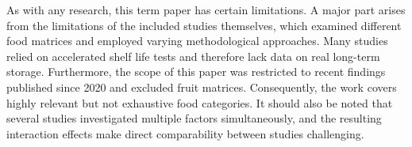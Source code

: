 As with any research, this term paper has certain limitations. A major part arises from the limitations of the included studies themselves, which examined different food matrices and employed varying methodological approaches. Many studies relied on accelerated shelf life tests and therefore lack data on real long-term storage. Furthermore, the scope of this paper was restricted to recent findings published since 2020 and excluded fruit matrices. Consequently, the work covers highly relevant but not exhaustive food categories. It should also be noted that several studies investigated multiple factors simultaneously, and the resulting interaction effects make direct comparability between studies challenging.


\enlargethispage{\baselineskip}
